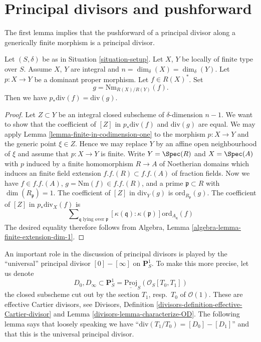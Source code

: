 \section{Principal divisors and pushforward}
\label{section-two-fun}

\noindent
The first lemma implies that the pushforward of a principal
divisor along a generically finite morphism is a principal divisor.

\begin{lemma}
\label{lemma-proper-pushforward-alteration}
Let $(S, \delta)$ be as in Situation \ref{situation-setup}.
Let $X$, $Y$ be locally of finite type over $S$. Assume $X$, $Y$
are integral and $n = \dim_\delta(X) = \dim_\delta(Y)$.
Let $p : X \to Y$ be a dominant proper morphism.
Let $f \in R(X)^*$. Set
$$
g = \text{Nm}_{R(X)/R(Y)}(f).
$$
Then we have
$p_*\text{div}(f) = \text{div}(g)$.
\end{lemma}

\begin{proof}
Let $Z \subset Y$ be an integral closed subscheme of $\delta$-dimension
$n - 1$. We want to show that the coefficient of $[Z]$ in
$p_*\text{div}(f)$ and $\text{div}(g)$ are equal. We may apply
Lemma \ref{lemma-finite-in-codimension-one}
to the morphism $p : X \to Y$ and the generic point $\xi \in Z$.
Hence we may replace $Y$ by an
affine open neighbourhood of $\xi$ and assume that $p : X \to Y$ is finite.
Write $Y = \Spec(R)$ and $X = \Spec(A)$ with $p$ induced
by a finite homomorphism $R \to A$ of Noetherian domains which induces
an finite field extension $f.f.(R) \subset f.f.(A)$ of fraction fields.
Now we have $f \in f.f.(A)$, $g = \text{Nm}(f) \in f.f.(R)$,
and a prime $\mathfrak p \subset R$ with $\dim(R_{\mathfrak p}) = 1$.
The coefficient of $[Z]$ in $\text{div}_Y(g)$ is
$\text{ord}_{R_\mathfrak p}(g)$.
The coefficient of $[Z]$ in $p_*\text{div}_X(f)$ is
$$
\sum\nolimits_{\mathfrak q\text{ lying over }\mathfrak p}
[\kappa(\mathfrak q) : \kappa(\mathfrak p)]
\text{ord}_{A_{\mathfrak q}}(f)
$$
The desired equality therefore follows from
Algebra, Lemma \ref{algebra-lemma-finite-extension-dim-1}.
\end{proof}

\noindent
An important role in the discussion of principal divisors
is played by the ``universal'' principal divisor $[0] - [\infty]$
on $\mathbf{P}^1_S$. To make this more precise, let us denote
$$
D_0, D_\infty \subset
\mathbf{P}^1_S = \underline{\text{Proj}}_S(\mathcal{O}_S[T_0, T_1])
$$
the closed subscheme cut out by the section $T_1$, resp.\ $T_0$
of $\mathcal{O}(1)$. These are effective Cartier divisors, see
Divisors, Definition \ref{divisors-definition-effective-Cartier-divisor}
and Lemma \ref{divisors-lemma-characterize-OD}.
The following lemma says that loosely speaking we have
``$\text{div}(T_1/T_0) = [D_0] - [D_1]$'' and that this is the
universal principal divisor.


